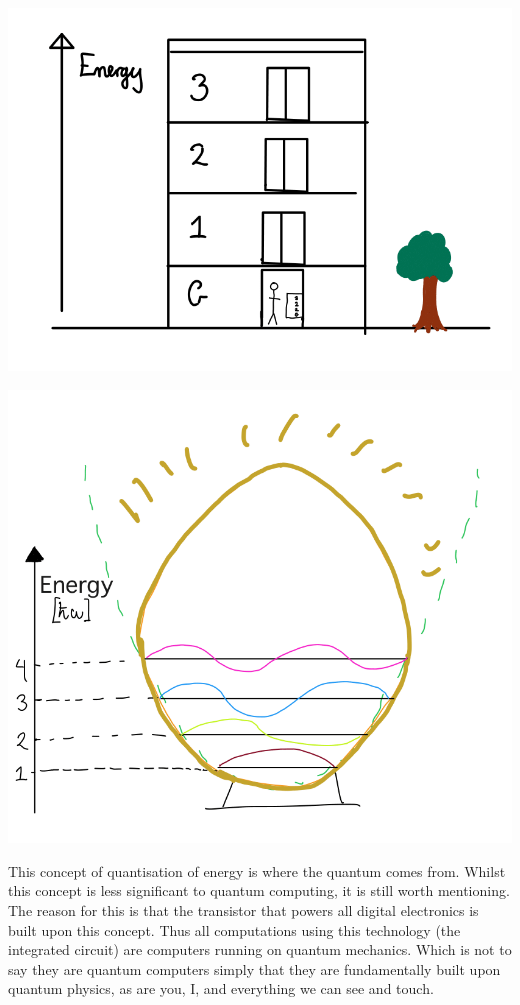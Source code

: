 \documentclass{book}
\begin{document}
\includegraphics{images/Energy_Levels.png}

\includegraphics{images/Light_bulb_quantised.png}

This concept of quantisation of energy is where the quantum comes from. Whilst this concept is less significant to quantum computing, it is still worth mentioning. The reason for this is that the transistor that powers all digital electronics is built upon this concept. Thus all computations using this technology (the integrated circuit) are computers running on quantum mechanics. Which is not to say they are quantum computers simply that they are fundamentally built upon quantum physics, as are you, I, and everything we can see and touch. 
\end{document}
